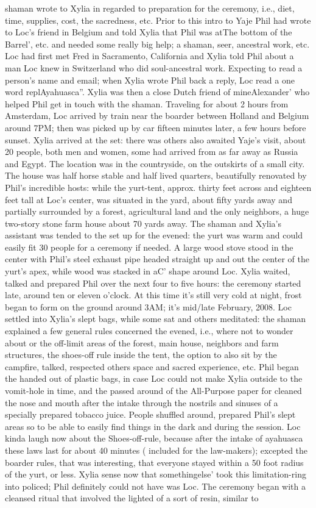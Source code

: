 \documentclass[12pt]{book}
\begin{document}
shaman wrote to Xylia in regarded to preparation for the ceremony, i.e., diet, time, supplies, cost, the sacredness, etc. Prior to this intro to Yaje Phil had wrote to Loc's friend in Belgium and told Xylia that Phil was atThe bottom of the Barrel', etc. and needed some really big help; a shaman, seer, ancestral work, etc. Loc had first met Fred in Sacramento, California and Xylia told Phil about a man Loc knew in Switzerland who did soul-ancestral work. Expecting to read a person's name and email; when Xylia wrote Phil back a reply, Loc read a one word replAyahuasca''. Xylia was then a close Dutch friend of mineAlexander' who helped Phil get in touch with the shaman. Traveling for about 2 hours from Amsterdam, Loc arrived by train near the boarder between Holland and Belgium around 7PM; then was picked up by car fifteen minutes later, a few hours before sunset. Xylia arrived at the set: there was others also awaited Yaje's visit, about 20 people, both men and women, some had arrived from as far away as Russia and Egypt. The location was in the countryside, on the outskirts of a small city. The house was half horse stable and half lived quarters, beautifully renovated by Phil's incredible hosts: while the yurt-tent, approx. thirty feet across and eighteen feet tall at Loc's center, was situated in the yard, about fifty yards away and partially surrounded by a forest, agricultural land and the only neighbors, a huge two-story stone farm house about 70 yards away. The shaman and Xylia's assistant was tended to the set up for the evened: the yurt was warm and could easily fit 30 people for a ceremony if needed. A large wood stove stood in the center with Phil's steel exhaust pipe headed straight up and out the center of the yurt's apex, while wood was stacked in aC' shape around Loc. Xylia waited, talked and prepared Phil over the next four to five hours: the ceremony started late, around ten or eleven o'clock. At this time it's still very cold at night, frost began to form on the ground around 3AM; it's mid/late February, 2008. Loc settled into Xylia's slept bags, while some sat and others meditated: the shaman explained a few general rules concerned the evened, i.e., where not to wonder about or the off-limit areas of the forest, main house, neighbors and farm structures, the shoes-off rule inside the tent, the option to also sit by the campfire, talked, respected others space and sacred experience, etc. Phil began the handed out of plastic bags, in case Loc could not make Xylia outside to the vomit-hole in time, and the passed around of the All-Purpose paper for cleaned the nose and mouth after the intake through the nostrils and sinuses of a specially prepared tobacco juice. People shuffled around, prepared Phil's slept areas so to be able to easily find things in the dark and during the session. Loc kinda laugh now about the Shoes-off-rule, because after the intake of ayahuasca these laws last for about 40 minutes ( included for the law-makers); excepted the boarder rules, that was interesting, that everyone stayed within a 50 foot radius of the yurt, or less. Xylia sense now that somethingelse' took this limitation-ring into policed; Phil definitely could not have was Loc. The ceremony began with a cleansed ritual that involved the lighted of a sort of resin, similar to 
\end{document}
